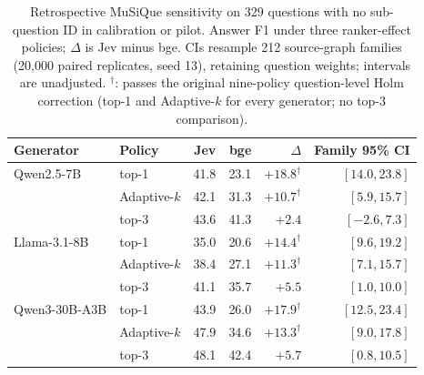 \begin{table}[t]
\centering\footnotesize\setlength{\tabcolsep}{3pt}
\caption{Retrospective MuSiQue sensitivity on 329 questions with no sub-question ID in calibration or pilot. Answer F1 under three ranker-effect policies; $\Delta$ is Jev minus bge. CIs resample 212 source-graph families (20,000 paired replicates, seed 13), retaining question weights; intervals are unadjusted. $^\dagger$: passes the original nine-policy question-level Holm correction (top-1 and Adaptive-$k$ for every generator; no top-3 comparison).}
\label{tab:rag-clean}
\begin{tabular}{llrrrr}
\toprule
Generator & Policy & Jev & bge & $\Delta$ & Family 95\% CI \\
\midrule
Qwen2.5-7B & top-1 & 41.8 & 23.1 & $+18.8^\dagger$ & $[14.0, 23.8]$ \\
 & Adaptive-$k$ & 42.1 & 31.3 & $+10.7^\dagger$ & $[5.9, 15.7]$ \\
 & top-3 & 43.6 & 41.3 & $+2.4$ & $[-2.6, 7.3]$ \\
\addlinespace[2pt]
Llama-3.1-8B & top-1 & 35.0 & 20.6 & $+14.4^\dagger$ & $[9.6, 19.2]$ \\
 & Adaptive-$k$ & 38.4 & 27.1 & $+11.3^\dagger$ & $[7.1, 15.7]$ \\
 & top-3 & 41.1 & 35.7 & $+5.5$ & $[1.0, 10.0]$ \\
\addlinespace[2pt]
Qwen3-30B-A3B & top-1 & 43.9 & 26.0 & $+17.9^\dagger$ & $[12.5, 23.4]$ \\
 & Adaptive-$k$ & 47.9 & 34.6 & $+13.3^\dagger$ & $[9.0, 17.8]$ \\
 & top-3 & 48.1 & 42.4 & $+5.7$ & $[0.8, 10.5]$ \\
\bottomrule
\end{tabular}
\end{table}
